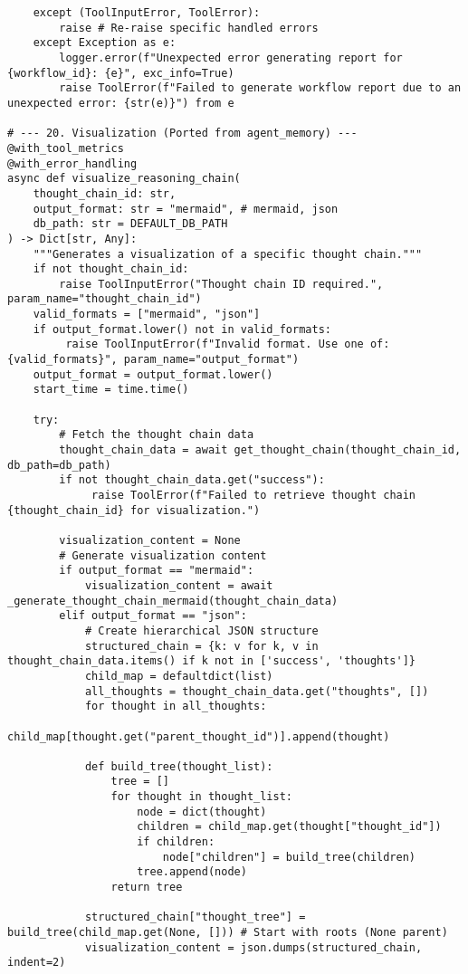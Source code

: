\documentclass[12pt,a4paper]{article}
\begin{document}
\begin{pageablecode}
\begin{verbatim}
    except (ToolInputError, ToolError):
        raise # Re-raise specific handled errors
    except Exception as e:
        logger.error(f"Unexpected error generating report for {workflow_id}: {e}", exc_info=True)
        raise ToolError(f"Failed to generate workflow report due to an unexpected error: {str(e)}") from e

# --- 20. Visualization (Ported from agent_memory) ---
@with_tool_metrics
@with_error_handling
async def visualize_reasoning_chain(
    thought_chain_id: str,
    output_format: str = "mermaid", # mermaid, json
    db_path: str = DEFAULT_DB_PATH
) -> Dict[str, Any]:
    """Generates a visualization of a specific thought chain."""
    if not thought_chain_id: 
        raise ToolInputError("Thought chain ID required.", param_name="thought_chain_id")
    valid_formats = ["mermaid", "json"]
    if output_format.lower() not in valid_formats:
         raise ToolInputError(f"Invalid format. Use one of: {valid_formats}", param_name="output_format")
    output_format = output_format.lower()
    start_time = time.time()

    try:
        # Fetch the thought chain data
        thought_chain_data = await get_thought_chain(thought_chain_id, db_path=db_path)
        if not thought_chain_data.get("success"):
             raise ToolError(f"Failed to retrieve thought chain {thought_chain_id} for visualization.")

        visualization_content = None
        # Generate visualization content
        if output_format == "mermaid":
            visualization_content = await _generate_thought_chain_mermaid(thought_chain_data)
        elif output_format == "json":
            # Create hierarchical JSON structure
            structured_chain = {k: v for k, v in thought_chain_data.items() if k not in ['success', 'thoughts']}
            child_map = defaultdict(list)
            all_thoughts = thought_chain_data.get("thoughts", [])
            for thought in all_thoughts: 
                child_map[thought.get("parent_thought_id")].append(thought)

            def build_tree(thought_list):
                tree = []
                for thought in thought_list:
                    node = dict(thought)
                    children = child_map.get(thought["thought_id"])
                    if children:
                        node["children"] = build_tree(children)
                    tree.append(node)
                return tree

            structured_chain["thought_tree"] = build_tree(child_map.get(None, [])) # Start with roots (None parent)
            visualization_content = json.dumps(structured_chain, indent=2)


\end{verbatim}
\end{pageablecode}
\end{document}
